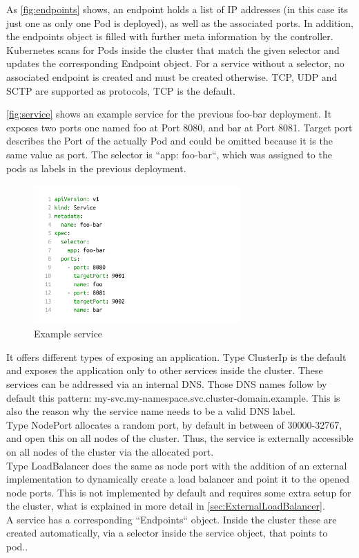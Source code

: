 As \autoref{fig:endpoints} shows, an endpoint holds a list of IP addresses (in this case its just one as only one Pod is deployed), as well as the associated ports.
In addition, the endpoints object is filled with further meta information by the controller.
Kubernetes scans for Pods inside the cluster that match the given selector and updates the corresponding Endpoint object.
For a service without a selector, no associated endpoint is created and must be created otherwise.
TCP, UDP and SCTP are supported as protocols, TCP is the default.

\autoref{fig:service} shows an example service for the previous foo-bar deployment.
It exposes two ports one named foo at Port 8080, and bar at Port 8081.
Target port describes the Port of the actually Pod and could be omitted because it is the same value as port.
The selector is ``app: foo-bar``, which was assigned to the pods as labels in the previous deployment.

\begin{figure}[H]
    \centering
    \includegraphics[width=0.7\textwidth, left]{media/02/service}
    \caption{Example service}
    \label{fig:service}
\end{figure}


It offers different types of exposing an application.
Type ClusterIp is the default and exposes the application only to other services inside the cluster.
These services can be addressed via an internal DNS.
Those DNS names follow by default this pattern: my-svc.my-namespace.svc.cluster-domain.example.
This is also the reason why the service name needs to be a valid DNS label.
\\
Type NodePort allocates a random port, by default in between of 30000-32767, and open this on all nodes of the cluster.
Thus, the service is externally accessible on all nodes of the cluster via the allocated port.
\\
Type LoadBalancer does the same as node port with the addition of an external implementation to dynamically create a load balancer and point it to the opened node ports.
This is not implemented by default and requires some extra setup for the cluster, what is explained in more detail in \autoref{sec:ExternalLoadBalancer}.
\\
A service has a corresponding ``Endpoints`` object.
Inside the cluster these are created automatically, via a selector inside the service object, that points to pod..~\cite{KUBERNETES-SERVICE}
